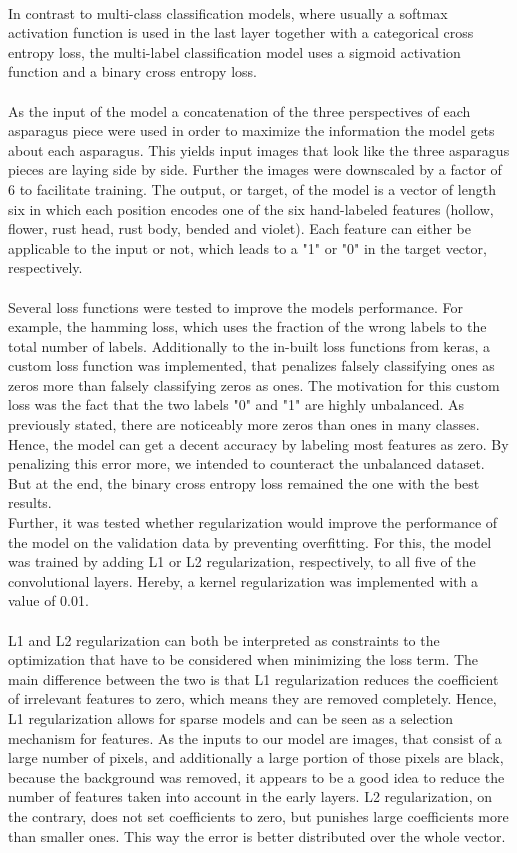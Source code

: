 \\
In contrast to multi-class classification models, where usually a softmax activation function is used in the last layer together with a categorical cross entropy loss, the multi-label classification model uses a sigmoid activation function and a binary cross entropy loss. \\
\\
As the input of the model a concatenation of the three perspectives of each asparagus piece were used in order to maximize the information the model gets about each asparagus. This yields input images that look like the three asparagus pieces are laying side by side. Further the images were downscaled by a factor of 6 to facilitate training.
The output, or target, of the model is a vector of length six in which each position encodes one of the six hand-labeled features (hollow, flower, rust head, rust body, bended and violet). Each feature can either be applicable to the input or not, which leads to a "1" or "0" in the target vector, respectively. \\
\\
Several loss functions were tested to improve the models performance. For example, the hamming loss, which uses the fraction of the wrong labels to the total number of labels. Additionally to the in-built loss functions from keras, a custom loss function was implemented, that penalizes falsely classifying ones as zeros more than falsely classifying zeros as ones. The motivation for this custom loss was the fact that the two labels "0" and "1" are highly unbalanced. As previously stated, there are noticeably more zeros than ones in many classes. Hence, the model can get a decent accuracy by labeling most features as zero. By penalizing this error more, we intended to counteract the unbalanced dataset. But at the end, the binary cross entropy loss remained the one with the best results. \\
Further, it was tested whether regularization would improve the performance of the model on the validation data by preventing overfitting. For this, the model was trained by adding L1 or L2 regularization, respectively, to all five of the convolutional layers.  Hereby, a kernel regularization was implemented with a value of 0.01. \\
\\
L1 and L2 regularization can both be interpreted as constraints to the optimization that have to be considered when minimizing the loss term. The main difference between the two is that L1 regularization reduces the coefficient of irrelevant features to zero, which means they are removed completely. Hence, L1 regularization allows for sparse models and can be seen as a selection mechanism for features. As the inputs to our model are images, that consist of a large number of pixels, and additionally a large portion of those pixels are black, because the background was removed, it appears to be a good idea to reduce the number of features taken into account in the early layers. L2 regularization, on the contrary, does not set coefficients to zero, but punishes large coefficients more than smaller ones. This way the error is better distributed over the whole vector. \\
